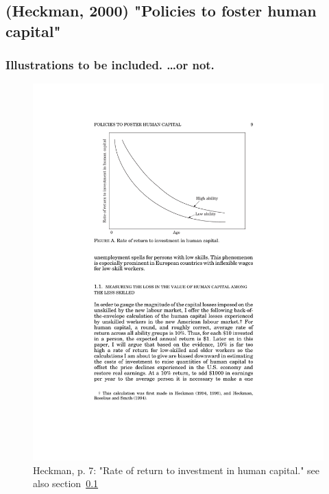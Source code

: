 \documentclass[12pt,a4paper]{article}
\begin{document}
    \subsection{(Heckman, 2000) "Policies to foster human capital"}
    \label{sec:Heckman2000}

  \subsubsection{Illustrations to be included. …or not.}
    \begin{figure}[htb]
      \centering
      \includegraphics[width=12cm]{Meeting 10 Policies to foster human capital - Seite 7.pdf}
      \caption{Heckman, p. 7: "Rate of return to investment in human capital." see also section~\ref{sec:Heckman2000}}
      \label{fig:Heckman rateofreturnhumancapital}
    \end{figure}
\end{document}
